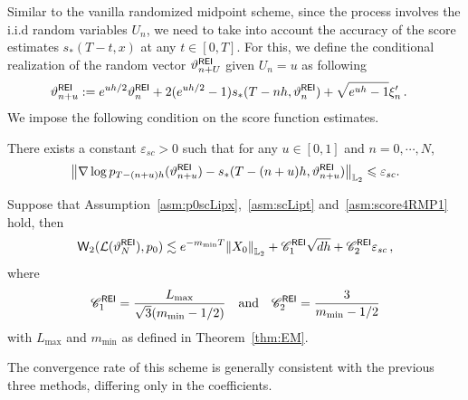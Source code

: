 \documentclass[11pt]{article}
\def\Ltwo{\mathbb L_2}
\def\wass{{\sf W}}
\def\law{{\mathcal L}}
\def\l|{\left\lVert}
\def\r|{\right\rVert}
\begin{document}
Similar to the vanilla randomized midpoint scheme, since the process involves the i.i.d random variables $U_n$, we need to take into account the accuracy of the score estimates $s_*(T-t,x)$ at any $t\in[0,T].$
For this, we define the conditional realization of the
random vector $\vartheta_{n+U}^{\sf REI}$ given $U_n=u$ as following
\begin{align*}
\vartheta_{n+u}^{\sf REI}&:=
e^{uh/2}\vartheta^{\sf REI}_{n}
+2(e^{uh/2}-1)s_*(T-nh,\vartheta^{\sf REI}_{n})  +\sqrt{e^{uh}-1}\xi'_n\,.
\end{align*}
We impose the following condition on the score function estimates.
\begin{assumption}
    \label{asm:score4RMP1}
    There exists a constant $\varepsilon_{sc}>0$ such that for any $u\in[0,1]$ and $n=0,\cdots,N$,
    \begin{align*}
        \l|\nabla\log p_{T-(n+u)h}(\vartheta_{n+u}^{\sf REI})-s_*(T-(n+u)h,\vartheta_{n+u}^{\sf REI})\r|_{\Ltwo}\leqslant \varepsilon_{sc}.
    \end{align*}
\end{assumption}
\begin{theorem}
    \label{thm:RMPEI}
    Suppose that Assumption~\ref{asm:p0scLipx},~\ref{asm:scLipt} and~\ref{asm:score4RMP1} hold, then
    \begin{align*}
        \wass_2(\law(\vartheta_N^{\sf REI}),p_0)\lesssim e^{-m_{\min}T}\l|X_0\r|_{\Ltwo}+\mathscr C_1^{\sf REI}\sqrt{dh}+\mathscr C_2^{\sf REI}\varepsilon_{sc}\,,
    \end{align*}
    where 
    \begin{align*}
        \mathscr C_1^{\sf REI}=\dfrac{L_{\max}}{\sqrt{3}(m_{\min}-1/2)}~~\text{ and }~~
        \mathscr C_2^{\sf REI}=\dfrac{3}{m_{\min}-1/2}
    \end{align*}
    with $L_{\max}$ and $m_{\min}$ as defined in Theorem~\ref{thm:EM}.
\end{theorem}
The convergence rate of this scheme is generally consistent with the previous three methods, differing only in the coefficients.
\end{document}
